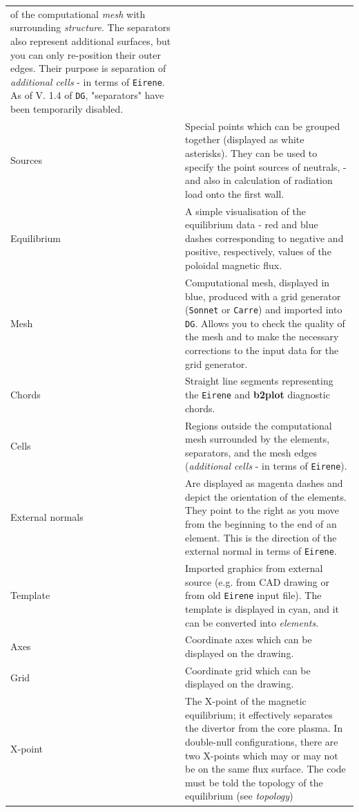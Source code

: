 \documentclass[a4paper,10pt]{report}
\newcommand{\btwoplot}{{\bf b2plot} }
\begin{document}
\begin{center}
\begin{longtable}{|l|p{12cm}|}
of the computational {\it mesh} with surrounding {\it structure}. The separators
also represent additional surfaces, but you can only re-position their
outer edges. Their purpose is separation of {\it additional cells} - in
terms of {\tt Eirene}. As of V. 1.4 of {\tt DG}, "separators" have been temporarily
disabled. \\
Sources             &
Special points which can be grouped together (displayed as white
asterisks). They can be used to specify the point sources of neutrals,
- and also in calculation of radiation load onto the first wall. \\
Equilibrium         &
A simple visualisation of the equilibrium data - red and blue dashes
corresponding to negative and positive, respectively,
values of the poloidal magnetic flux. \\
Mesh                &
Computational mesh, displayed in blue, produced with a grid generator
({\tt Sonnet} or {\tt Carre}) and imported into {\tt DG}.
Allows you to check the quality of the mesh and
to make the necessary corrections to the input data for the grid
generator. \\
Chords              &
Straight line segments representing the {\tt Eirene}
and \btwoplot diagnostic chords. \\
Cells               &
Regions outside the computational mesh surrounded by the elements,
separators, and the mesh edges ({\it additional cells} - in terms of
{\tt Eirene}). \\
External normals    &
Are displayed as magenta dashes and depict the orientation of the elements. They
point to the right as you move from the beginning to the end
of an element. This is the direction of the external normal in terms
of {\tt Eirene}. \\
Template            &
Imported graphics from external source (e.g. from CAD drawing or from
old {\tt Eirene} input file). The template is displayed in cyan, and it can
be converted into {\it elements}. \\
Axes                &
Coordinate axes which can be displayed on the drawing. \\
Grid                &
Coordinate grid which can be displayed on the drawing. \\
X-point             &
The X-point of the magnetic equilibrium; it effectively separates the divertor
from the core plasma.  In double-null configurations, there are two
X-points which may or may not be on the same flux surface.
The code must be told the topology of the equilibrium (see {\it topology})

\end{longtable}
\end{center}
\end{document}
